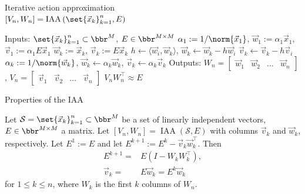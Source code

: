\documentclass{beamer}
\DeclareMathOperator{\iaa}{IAA} %
\begin{document}
\begin{frame}
\begin{algorithm}[H]
	\caption{Iterative action approximation \\ $[V_n,W_n]=\iaa \left ( \set{\vec{x}_k}_{k=1}^n, E \right )$}
	\begin{algorithmic}[1]
		\State Inputs: $\set{\vec{x}_k}_{k=1}^{n} \subset \bbr^M$, $E \in \bbr^{M \times M}$
		\State $\alpha_1 := 1 / \norm{\vec{x}_1}$, $\vec{w}_1 := \alpha_1 \vec{x}_1$, $\vec{v}_1 := \alpha_1 E \vec{x}_1$
			\State $\vec{w}_k := \vec{x}_k$, $\vec{v}_k := E \vec{x}_k$
				\State $h \gets \langle \vec{w}_i, \vec{w}_k \rangle$, $\vec{w}_k \gets \vec{w}_k - h \vec{w}_i$
				\State $\vec{v}_k \gets \vec{v}_k - h \vec{v}_i$ \label{line: implicit}
			\EndFor
			\State $\alpha_k := 1 / \norm{\vec{w}_k}$, $\vec{w}_k \gets \alpha_k \vec{w}_k$, $\vec{v}_k \gets \alpha_k \vec{v}_k$
		\EndFor
		\State Outputs: $W_{n} = \begin{bmatrix} \vec{w}_1 & \vec{w}_2 & \dots & \vec{w}_{n} \end{bmatrix}$, $V_{n} = \begin{bmatrix} \vec{v}_1 & \vec{v}_2 & \dots & \vec{v}_{n} \end{bmatrix}$
		\State $V_{n} W_{n}^\top \approx E$
	\end{algorithmic}
	\label{alg: IAA}
\end{algorithm}
\end{frame}

\begin{frame}{Properties of the IAA}
\begin{lemma} \label{lem: iaa}
	Let $\mathcal{S}=\set{\vec{x}_k}_{k=1}^n \subset \bbr^M$ be a set of linearly independent vectors, $E \in \bbr^{M \times M}$ a matrix.
	Let $[V_n,W_n]=\iaa(\mathcal{S},E)$ with columns $\vec{v}_k$ and $\vec{w}_k$, respectively.
	Let $E^1 := E$ and let $E^{k+1} := E^k - \vec{v}_k \vec{w}_k^\top$.
	Then
	\begin{align*}
		E^{k+1} = & E (I - W_k W_k^\top), \\
		\vec{v}_k = & E \vec{w}_k = E^k \vec{w}_k
	\end{align*}
	for $1 \leq k \leq n$, where $W_k$ is the first $k$ columns of $W_n$.
\end{lemma}
\end{frame}
\end{document}
